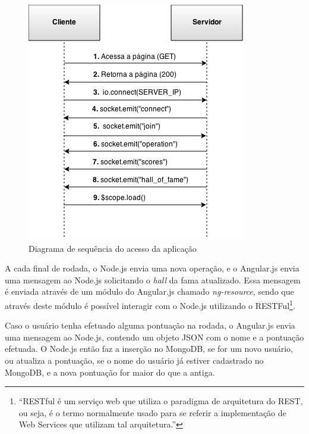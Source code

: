 \begin{description}
    \begin{figure}[htb]
    \centering
    \includegraphics[scale=0.7]{images/diagrama_de_seq_acesso.png}
    \caption{Diagrama de sequência do acesso da aplicação}
    \label{fig: Diagrama de sequência do acesso da aplicação}
    \end{figure}

A cada final de rodada, o Node.js envia uma nova operação, e o Angular.js envia uma mensagem ao Node.js solicitando o \textit{hall} da fama atualizado. Essa mensagem é enviada através de um módulo do Angular.js chamado \textit{ng-resource}, sendo que através deste módulo é possível interagir com o Node.js utilizando o RESTFul\footnote{ ``RESTful é um serviço web que utiliza o paradigma de arquitetura do REST, ou seja, é o termo normalmente usado para se referir a implementação de Web Services que utilizam tal arquitetura.''\cite{RESTWiki}}. 

Caso o usuário tenha efetuado alguma pontuação na rodada, o Angular.js envia uma mensagem ao Node.js, contendo um objeto JSON com o nome e a pontuação efetuada. O Node.js então faz a inserção no MongoDB, se for um novo usuário, ou atualiza a pontuação, se o nome do usuário já estiver cadastrado no MongoDB, e a nova pontuação for maior do que a antiga.

\end{description}


